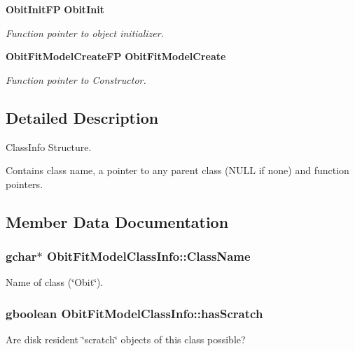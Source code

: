 \begin{CompactItemize}
{\bf Obit\-Init\-FP} {\bf Obit\-Init}
\begin{CompactList}\small\item\em Function pointer to object initializer. \item\end{CompactList}\item 
{\bf Obit\-Fit\-Model\-Create\-FP} {\bf Obit\-Fit\-Model\-Create}
\begin{CompactList}\small\item\em Function pointer to Constructor. \item\end{CompactList}\end{CompactItemize}


\subsection{Detailed Description}
Class\-Info Structure. 

Contains class name, a pointer to any parent class (NULL if none) and function pointers. 



\subsection{Member Data Documentation}
\subsubsection{\setlength{\rightskip}{0pt plus 5cm}gchar$\ast$ {\bf Obit\-Fit\-Model\-Class\-Info::Class\-Name}}\label{structObitFitModelClassInfo_o2}


Name of class (\char`\"{}Obit\char`\"{}). 

\subsubsection{\setlength{\rightskip}{0pt plus 5cm}gboolean {\bf Obit\-Fit\-Model\-Class\-Info::has\-Scratch}}\label{structObitFitModelClassInfo_o1}


Are disk resident \char`\"{}scratch\char`\"{} objects of this class possible? 

